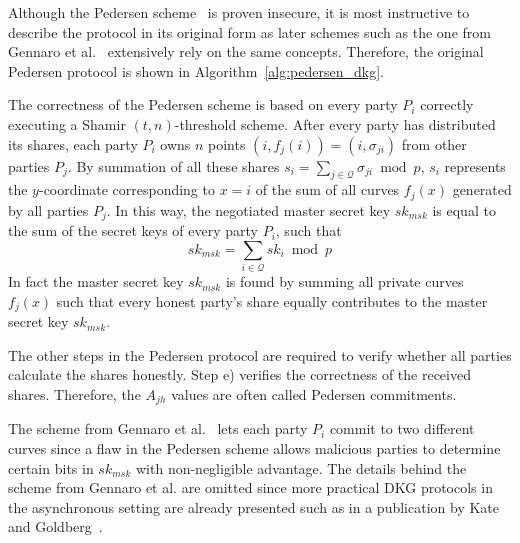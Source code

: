Although the Pedersen scheme~\cite{art:Pedersen91a} is proven insecure, it is most instructive to describe the protocol in its original form as later schemes such as the one from Gennaro et al.~\cite{art:GennaroJKR07} extensively rely on the same concepts. Therefore, the original Pedersen protocol is shown in Algorithm~\ref{alg:pedersen_dkg}. 

The correctness of the Pedersen scheme is based on every party $P_i$ correctly executing a Shamir $\left( t, n \right)$-threshold scheme. After every party has distributed its shares, each party $P_i$ owns $n$ points $\left( i, f_j \left( i \right) \right) = \left( i, \sigma_{ji} \right)$ from other parties $P_j$. By summation of all these shares $s_i = \sum_{j \in \mathcal{Q}} \sigma_{ji} \bmod p$, $s_i$ represents the $y$-coordinate corresponding to $x=i$ of the sum of all curves $f_j \left( x \right)$ generated by all parties $P_j$. In this way, the negotiated master secret key $sk_{msk}$ is equal to the sum of the secret keys of every party $P_i$, such that
 \begin{equation*}
  sk_{msk} = \sum_{i \in \mathcal{Q}} sk_i \bmod p
 \end{equation*}
In fact the master secret key $sk_{msk}$ is found by summing all private curves $f_j \left( x \right)$ such that every honest party's share equally contributes to the master secret key $sk_{msk}$.

The other steps in the Pedersen protocol are required to verify whether all parties calculate the shares honestly. Step e) verifies the correctness of the received shares. Therefore, the $A_{jh}$ values are often called Pedersen commitments. 

The scheme from Gennaro et al.~\cite{art:GennaroJKR07} lets each party $P_i$ commit to two different curves since a flaw in the Pedersen scheme allows malicious parties to determine certain bits in $sk_{msk}$ with non-negligible advantage. The details behind the scheme from Gennaro et al. are omitted since more practical DKG protocols in the asynchronous setting are already presented such as in a publication by Kate and Goldberg~\cite{art:KateHG12}.

